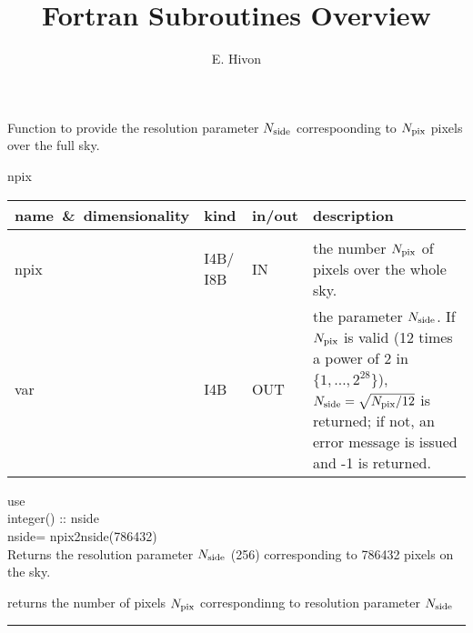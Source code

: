 

\sloppy


\title{\healpix Fortran Subroutines Overview}
 \section[npix2nside]{ }
\label{sub:npix2nside}
\author{E. Hivon}

\begin{facility}
{Function to provide the resolution parameter ${N_{\rm side}}$ correspoonding to ${N_{\rm pix}}$
pixels over the full sky. 
}
{\modPixTools}
\end{facility}

\begin{f90function}
{npix}
\end{f90function}

\begin{arguments}
{
\begin{tabular}{p{0.3\hsize} p{0.05\hsize} p{0.1\hsize} p{0.45\hsize}} \hline  
\textbf{name~\&~dimensionality} & \textbf{kind} & \textbf{in/out} & \textbf{description} \\ \hline
                   &   &   &                           \\ %
npix & I4B/ I8B & IN & the number ${N_{\rm pix}}$ of pixels over the whole sky. \\
var & I4B & OUT & the parameter ${N_{\rm side}}$. If ${N_{\rm pix}}$ is valid (12 times a power of 2 in
$\{1,\ldots,2^{28}\}$), ${N_{\rm side}}=\sqrt{{N_{\rm pix}}/12}$ is returned; if not, an error message is
issued and -1 is returned.\\
\end{tabular}
}
\end{arguments}

\begin{example}
{
use  \\
integer() :: nside \\
nside= npix2nside(786432)  \\
}
{
Returns the resolution parameter ${N_{\rm side}}$ (256) corresponding to 786432 pixels
on the sky.
}
\end{example}
\begin{related}
  \begin{sulist}{} %
  \item[\htmlref{nside2npix}{sub:nside2npix}] returns the number of pixels ${N_{\rm pix}}$ correspondinng to
  resolution parameter ${N_{\rm side}}$
  \end{sulist}
\end{related}

\rule{\hsize}{2mm}

